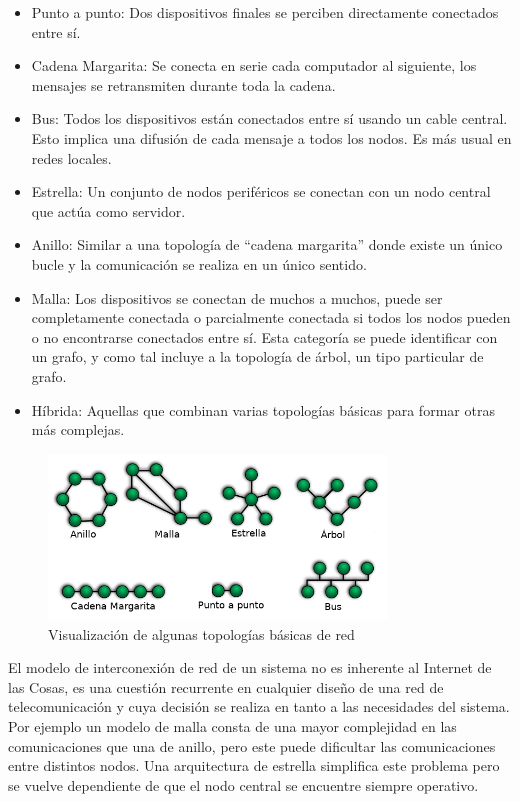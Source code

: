 \documentclass[a4paper,10pt]{article}
\begin{document}
\begin{itemize}
\item{Punto a punto: Dos dispositivos finales se perciben directamente
  conectados entre sí.}
\item{Cadena Margarita: Se conecta en serie cada computador al
  siguiente, los mensajes se retransmiten durante toda la cadena.}
\item{Bus: Todos los dispositivos están conectados entre sí usando
  un cable central. Esto implica una difusión de cada mensaje a
  todos los nodos. Es más usual en redes locales.}
\item{Estrella: Un conjunto de nodos periféricos se conectan con un
  nodo central que actúa como servidor.}
\item{Anillo: Similar a una topología de “cadena margarita” donde
  existe un único bucle y la comunicación se realiza en un único
  sentido.}
\item{Malla: Los dispositivos se conectan de muchos a muchos, puede
  ser completamente conectada o parcialmente conectada si todos los
  nodos pueden o no encontrarse conectados entre sí. Esta categoría se
  puede identificar con un grafo, y como tal incluye a la topología de
  árbol, un tipo particular de grafo.}
\item{Híbrida: Aquellas que combinan varias topologías básicas para
  formar otras más complejas.}
\end{itemize}


\begin{figure}[H]
  \centering
  \includegraphics[width=0.8\textwidth]{img/NetworkTopologies_esp.png}
  \caption{Visualización de algunas topologías básicas de red}\label{fig:topologias-red}
\end{figure}



El modelo de interconexión de red de un sistema no es inherente al
Internet de las Cosas, es una cuestión recurrente en cualquier diseño
de una red de telecomunicación y cuya decisión se realiza en tanto a
las necesidades del sistema. Por ejemplo un modelo de malla consta de
una mayor complejidad en las comunicaciones que una de anillo, pero
este puede dificultar las comunicaciones entre distintos nodos. Una
arquitectura de estrella simplifica este problema pero se vuelve
dependiente de que el nodo central se encuentre siempre operativo.
\end{document}
